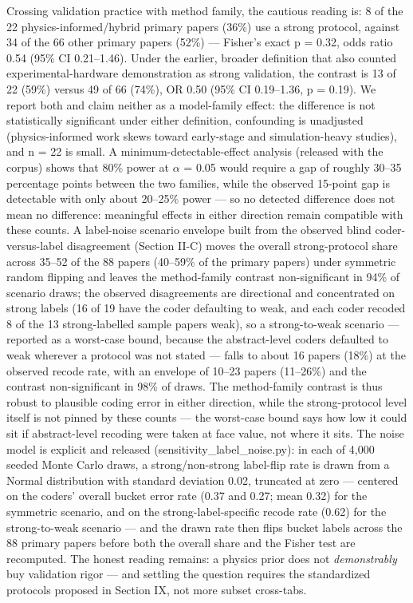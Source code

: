 \documentclass[journal]{IEEEtran}
\begin{document}
Crossing validation practice with method family, the cautious reading is: 8 of the 22 physics-informed/hybrid primary papers (36\%) use a strong protocol, against 34 of the 66 other primary papers (52\%) --- Fisher's exact p = 0.32, odds ratio 0.54 (95\% CI 0.21--1.46). Under the earlier, broader definition that also counted experimental-hardware demonstration as strong validation, the contrast is 13 of 22 (59\%) versus 49 of 66 (74\%), OR 0.50 (95\% CI 0.19--1.36, p = 0.19). We report both and claim neither as a model-family effect: the difference is not statistically significant under either definition, confounding is unadjusted (physics-informed work skews toward early-stage and simulation-heavy studies), and n = 22 is small. A minimum-detectable-effect analysis (released with the corpus) shows that 80\% power at $\alpha$ = 0.05 would require a gap of roughly 30--35 percentage points between the two families, while the observed 15-point gap is detectable with only about 20--25\% power --- so no detected difference does not mean no difference: meaningful effects in either direction remain compatible with these counts. A label-noise scenario envelope built from the observed blind coder-versus-label disagreement (Section II-C) moves the overall strong-protocol share across 35--52 of the 88 papers (40--59\% of the primary papers) under symmetric random flipping and leaves the method-family contrast non-significant in 94\% of scenario draws; the observed disagreements are directional and concentrated on strong labels (16 of 19 have the coder defaulting to weak, and each coder recoded 8 of the 13 strong-labelled sample papers weak), so a strong-to-weak scenario --- reported as a worst-case bound, because the abstract-level coders defaulted to weak wherever a protocol was not stated --- falls to about 16 papers (18\%) at the observed recode rate, with an envelope of 10--23 papers (11--26\%) and the contrast non-significant in 98\% of draws. The method-family contrast is thus robust to plausible coding error in either direction, while the strong-protocol level itself is not pinned by these counts --- the worst-case bound says how low it could sit if abstract-level recoding were taken at face value, not where it sits. The noise model is explicit and released (sensitivity\_label\_noise.py): in each of 4,000 seeded Monte Carlo draws, a strong/non-strong label-flip rate is drawn from a Normal distribution with standard deviation 0.02, truncated at zero --- centered on the coders' overall bucket error rate (0.37 and 0.27; mean 0.32) for the symmetric scenario, and on the strong-label-specific recode rate (0.62) for the strong-to-weak scenario --- and the drawn rate then flips bucket labels across the 88 primary papers before both the overall share and the Fisher test are recomputed. The honest reading remains: a physics prior does not \textit{demonstrably} buy validation rigor --- and settling the question requires the standardized protocols proposed in Section IX, not more subset cross-tabs.
\end{document}
